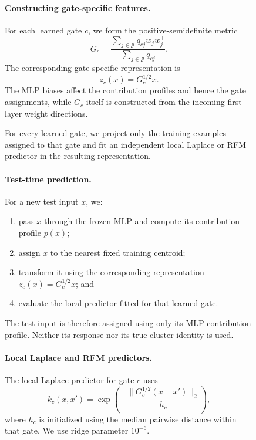 \documentclass{article}
\begin{document}
\begin{figure}
\paragraph{Constructing gate-specific features.}
For each learned gate \(c\), we form the positive-semidefinite metric
\begin{equation}
    G_c
    =
    \frac{
        \displaystyle
        \sum_{j\in\mathcal J}q_{cj}w_jw_j^\top
    }{
        \displaystyle
        \sum_{j\in\mathcal J}q_{cj}
    }.
    \label{eq:appendix-mlp-derived-metric}
\end{equation}
The corresponding gate-specific representation is
\begin{equation}
    z_c(x)=G_c^{1/2}x.
    \label{eq:appendix-mlp-derived-projection}
\end{equation}
The MLP biases affect the contribution profiles and hence the gate
assignments, while \(G_c\) itself is constructed from the incoming
first-layer weight directions.

For every learned gate, we project only the training examples assigned to
that gate and fit an independent local Laplace or RFM predictor in the
resulting representation.

\paragraph{Test-time prediction.}
For a new test input \(x\), we:

\begin{enumerate}
    \item pass \(x\) through the frozen MLP and compute its contribution
    profile \(p(x)\);
    \item assign \(x\) to the nearest fixed training centroid;
    \item transform it using the corresponding representation
    \(z_c(x)=G_c^{1/2}x\); and
    \item evaluate the local predictor fitted for that learned gate.
\end{enumerate}

The test input is therefore assigned using only its MLP contribution profile.
Neither its response nor its true cluster identity is used.

\paragraph{Local Laplace and RFM predictors.}
The local Laplace predictor for gate \(c\) uses
\[
    k_c(x,x')
    =
    \exp\!\left(
        -\frac{
            \|G_c^{1/2}(x-x')\|_2
        }{h_c}
    \right),
\]
where \(h_c\) is initialized using the median pairwise distance within that
gate. We use ridge parameter \(10^{-6}\).


\end{figure}
\end{document}
